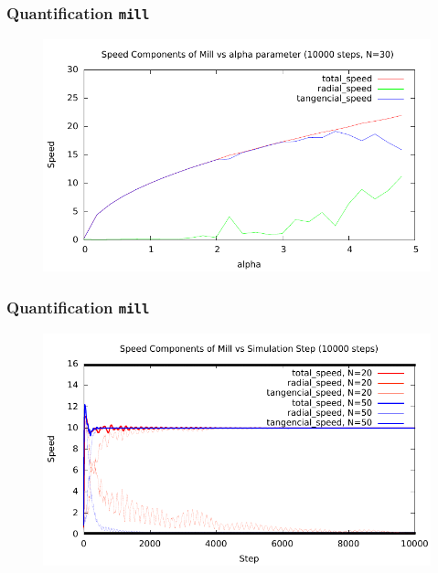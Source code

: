 \documentclass[compress]{beamer}
\begin{document}
\begin{frame}
	\frametitle{Quantification \texttt{mill}}	
	\begin{figure}[H]
		\includegraphics[width=1. \columnwidth]{../plots/mill_II_speeds_alpha_10000.pdf}
	\end{figure}	
\end{frame}


\begin{frame}
	\frametitle{Quantification \texttt{mill}}	
	\begin{figure}[H]
		\includegraphics[width=1. \columnwidth]{../plots/mill_II_speeds_dt_allN.pdf}
	\end{figure}	
\end{frame}


\end{document}
